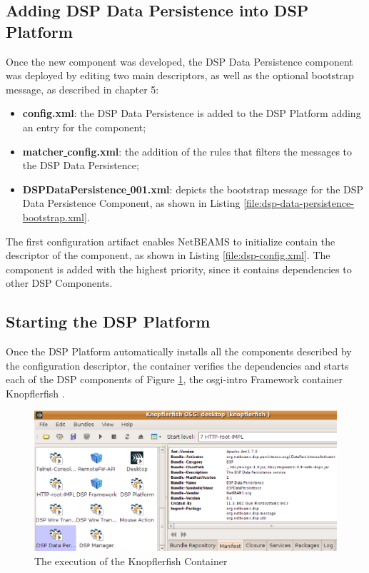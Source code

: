 \subsection{Adding DSP Data Persistence into DSP Platform }

Once the new component was developed, the DSP Data Persistence component was
deployed by editing two main descriptors, as well as the optional bootstrap
message, as described in chapter 5:

\begin{itemize}
  \item \textbf{config.xml}: the DSP Data Persistence is added to the DSP
  Platform adding an entry for the component;
  \item \textbf{matcher\underline{ }config.xml}: the addition of the rules that
  filters the messages to the DSP Data Persistence;
  \item \textbf{DSPDataPersistence\underline{ }001.xml}: depicts the bootstrap
  message for the DSP Data Persistence Component, as shown in Listing 
  \ref{file:dsp-data-persistence-bootstrap.xml}.
\end{itemize}

The first configuration artifact enables NetBEAMS to initialize contain the
descriptor of the component, as shown in Listing \ref{file:dsp-config.xml}.
The component is added with the highest priority, since it contains
dependencies to other DSP Components. 
\subsection{Starting the DSP Platform}

Once the DSP Platform automatically installs all the components described by
the configuration descriptor, the container verifies the dependencies and
starts each of the DSP components of Figure \ref{fig:knopflerfish-execution},
the osgi-intro Framework container Knopflerfish \cite{knopflerfish}.

\begin{figure}[!t]
  \centering
  \includegraphics[scale=0.65]{../diagrams/knopflerfish-execution}
  \caption{The execution of the Knopflerfish Container}
  \label{fig:knopflerfish-execution}
\end{figure}

